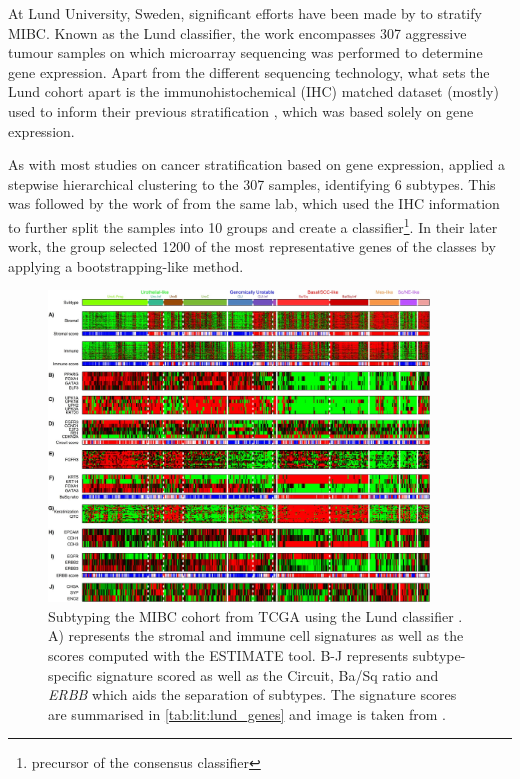 At Lund University, Sweden, significant efforts have been made by \citet{Sjodahl2017-xr, Marzouka2018-ge} to stratify MIBC. Known as the Lund classifier, the work encompasses 307 aggressive tumour samples on which microarray sequencing was performed to determine gene expression. Apart from the different sequencing technology, what sets the Lund cohort apart is the immunohistochemical (IHC) matched dataset (mostly) used to inform their previous stratification \citet{Sjodahl2017-xr}, which was based solely on gene expression.

As with most studies on cancer stratification based on gene expression, \citet{Sjodahl2017-xr} applied a stepwise hierarchical clustering to the 307 samples, identifying 6 subtypes. This was followed by the work of \citet{Marzouka2018-ge} from the same lab, which used the IHC information to further split the samples into 10 groups and create a classifier\footnote{precursor of the consensus classifier}. In their later work, the group selected 1200 of the most representative genes of the classes by applying a bootstrapping-like method.

\begin{figure}[!t]   
\centering
\includegraphics[width=0.9\textwidth,height=0.9\textheight,keepaspectratio]{Sections/Lit_review/Resources/Lung_subtypes.jpg}
  \caption{Subtyping the MIBC cohort from TCGA using the Lund classifier \cite{Marzouka2018-ge}. A) represents the stromal and immune cell signatures as well as the scores computed with the ESTIMATE tool\cite{Yoshihara2013-wq}. B-J represents subtype-specific signature scored as well as the Circuit, Ba/Sq ratio and \textit{ERBB} which aids the separation of subtypes. The signature scores are summarised in \cref{tab:lit:lund_genes} and image is taken from \cite{Marzouka2018-ge}.
}
\label{fig:lit:lund_fig}
\end{figure}
\FloatBarrier


